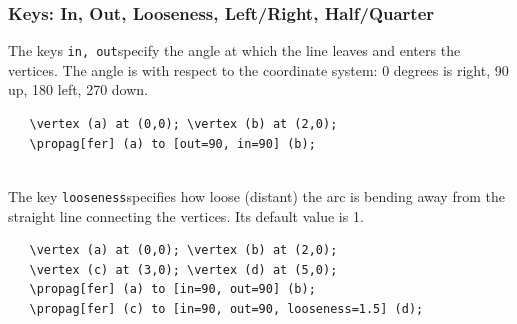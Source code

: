 \documentclass[10pt,letterpaper,twoside,notitlepage]{article}
\numberwithin{figure}{section}
\begin{document}
\subsubsection{Keys: In, Out, Looseness, Left/Right, Half/Quarter}
\label{sec:_feynmandiagrams_keysinoutetc}
%
\noindent
The keys \vercol\verb$in, out$\txcol specify the angle
at which the line leaves and enters the vertices.
The angle is with respect to the coordinate system:
0 degrees is right, 90 up, 180 left, 270 down.
\vspace{2mm}\\
%
\begin{minipage}{0.7\linewidth}
\vercol\begin{verbatim}
   \vertex (a) at (0,0); \vertex (b) at (2,0);
   \propag[fer] (a) to [out=90, in=90] (b);
\end{verbatim}\txcol
\end{minipage}
%
\begin{minipage}{0.25\linewidth}
\end{minipage}
\\
The key \vercol\verb$looseness$\txcol specifies
how loose (distant) the arc is bending away
from the straight line connecting the vertices.
Its default value is 1.
\vspace{2mm}\\
%
\begin{minipage}{0.7\linewidth}
\vercol\begin{verbatim}
   \vertex (a) at (0,0); \vertex (b) at (2,0);
   \vertex (c) at (3,0); \vertex (d) at (5,0);
   \propag[fer] (a) to [in=90, out=90] (b);
   \propag[fer] (c) to [in=90, out=90, looseness=1.5] (d);
\end{verbatim}\txcol
\end{minipage}
%
\begin{minipage}{0.25\linewidth}
\end{minipage}
\end{document}

